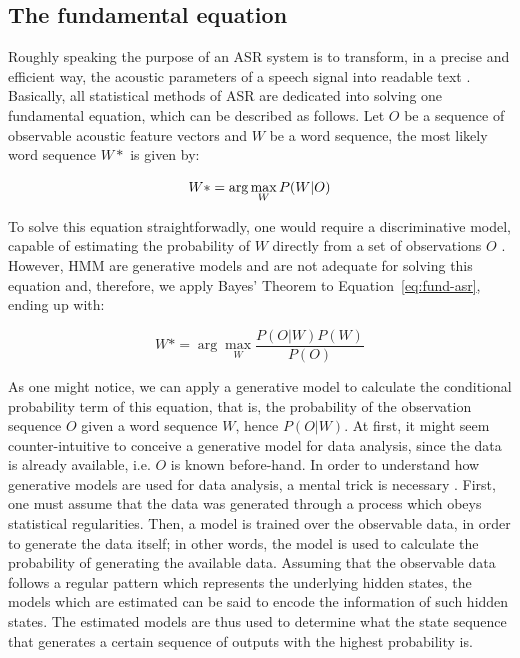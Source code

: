 \subsection{The fundamental equation}

Roughly speaking the purpose of an \ac{ASR} system is to transform, in a precise and efficient way, the acoustic parameters of a speech signal into readable text \cite{Rabiner2007}.
Basically, all statistical methods of \ac{ASR} are dedicated into solving one fundamental 
equation, which can be described as follows. Let $O$ be a sequence of observable acoustic 
feature vectors and $W$ be a word sequence, the most likely word sequence $W*$ is given by:

\begin{equation}{\label{eq:fund-asr}}
W*= \arg\max_{W}P(W|O)
\end{equation}

To solve this equation straightforwadly, one would require a discriminative model,
capable of estimating the probability of $W$ directly from a set of observations $O$ \cite{Gales2008}.
However, \ac{HMM} are generative models and are not adequate for solving this equation and,
therefore, we apply Bayes' Theorem to Equation~\ref{eq:fund-asr}, ending up with:

\begin{equation}
W*= \arg\max_{W}\frac{P(O|W)P(W)}{P(O)}
\end{equation}

As one might notice, we can apply a generative model to calculate the conditional probability term of this
equation, that is, the probability of the observation sequence $O$ given a word sequence $W$, hence $P(O|W)$.
At first, it might seem counter-intuitive to conceive a generative model for data analysis, since the 
data is already available, i.e. $O$ is known before-hand. In order to understand how generative models are used for data analysis, a mental trick is necessary \cite{Fink2014}. First, one must assume that the data was generated through a process which obeys statistical regularities. Then, a model is trained over the observable data, in order to generate the data itself; in other words, the model is used to calculate the probability of generating the available data. Assuming that the observable data follows a regular pattern which represents the underlying hidden states, the models which are estimated can be said to encode the information of such hidden states. The estimated models are thus used to determine what the state sequence that generates a certain sequence of outputs with the highest probability is.

